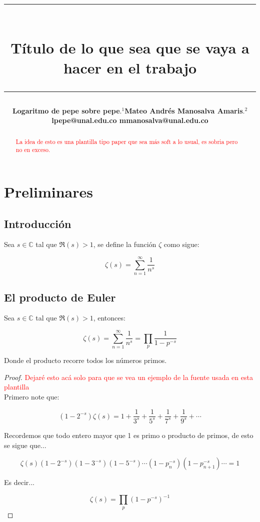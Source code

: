 \documentclass[12pt]{article}
\title{\vspace{-2cm}\par\noindent\rule{16cm}{1pt}\large
\\\bfseries Título de lo que sea que se vaya a hacer en el trabajo
\vspace{-0.34cm}\par\noindent\hspace{0.15cm}\rule{16cm}{1pt}
\vspace{-0.2cm}
}
\author{\small \bfseries Logaritmo de pepe sobre pepe$.^1$\small \phantom{lkllkhhhhhhh}Mateo Andrés Manosalva Amaris$.^{2}$\\ \small lpepe@unal.edu.co\hspace{4.8cm} mmanosalva@unal.edu.co
}
\begin{document}
\maketitle
\begin{abstract}
\textcolor{red}{La idea de esto es una plantilla tipo paper que sea más soft a lo usual, es sobria pero no en exceso.}\lipsum[1]
\end{abstract}

\section{Preliminares}

\subsection{Introducción}
\lipsum[2]
\begin{definition}
Sea $s \in \mathbb{C}$ tal que $\Re(s)>1$, se define la función $\zeta$ como sigue:

$$\zeta(s)=\sum_{n=1}^{\infty}\dfrac{1}{n^s}$$
\end{definition}

\begin{note}
   \lipsum[3]
\end{note}

\lipsum[4]

\subsection{El producto de Euler}

\lipsum[3]

\begin{theorem}
    Sea $s\in \mathbb{C}$ tal que $\Re(s)>1$, entonces:

    $$\zeta(s)=\sum_{n=1}^{\infty}\dfrac{1}{n^s}=\prod_p \dfrac{1}{1-p^{-s}}$$

    Donde el producto recorre todos los números primos.
\end{theorem}


\begin{proof}

\textcolor{red}{Dejaré esto acá solo para que se vea un ejemplo de la fuente usada en esta plantilla}\\

    Primero note que:

    $$(1-2^{-s})\zeta(s)=1+\dfrac{1}{3^s}+\dfrac{1}{5^s}+\dfrac{1}{7^s}+\dfrac{1}{9^s}+\cdots$$

    Recordemos que todo entero mayor que 1 es primo o producto de primos, de esto se sigue que...

    $$\zeta(s)\left(1-2^{-s}\right)(1-3^{-s})(1-5^{-s})\cdots(1-p_n^{-s})(1-p_{n+1}^{-s})\cdots=1$$

    Es decir...

    $$\zeta(s)=\prod_p (1-p^{-s})^{-1}$$
\end{proof}
\end{document}
